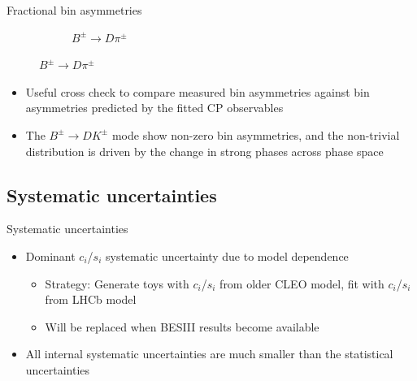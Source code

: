 \documentclass{beamer}
\begin{document}
\begin{frame}{Fractional bin asymmetries}
\begin{figure}
\begin{subfigure}{0.5\textwidth}
      \caption{$B^\pm\to D\pi^\pm$}
    \end{subfigure}
  \end{figure}
  \begin{itemize}
    \item{Useful cross check to compare measured bin asymmetries against bin asymmetries predicted by the fitted CP observables}
    \item{The $B^\pm\to DK^\pm$ mode show non-zero bin asymmetries, and the non-trivial distribution is driven by the change in strong phases across phase space}
  \end{itemize}
\end{frame}

\subsection{Systematic uncertainties}
\begin{frame}{Systematic uncertainties}
  \begin{itemize}
    \setlength\itemsep{1.0em}
    \item{Dominant $c_i$/$s_i$ systematic uncertainty due to model dependence}
    \begin{itemize}
      \item{Strategy: Generate toys with $c_i$/$s_i$ from older CLEO model, fit with $c_i$/$s_i$ from LHCb model}
      \item{Will be replaced when BESIII results become available}
    \end{itemize}
    \item{All internal systematic uncertainties are much smaller than the statistical uncertainties}
  \end{itemize}
\end{frame}
\end{document}
